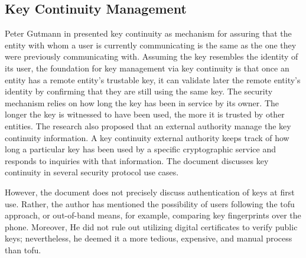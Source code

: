 \subsection{Key Continuity Management}
Peter Gutmann in \cite{gutmann-kcm-01} presented key continuity as  mechanism for assuring that the entity with whom a user is currently communicating is the same as the one they were previously communicating with.
Assuming the key resembles the identity of its user, the foundation for key management via key continuity is that once an entity has a remote entity's trustable key, it can validate later the remote entity's identity by confirming that they are still using the same key. The security mechanism relies on how long the key has been in service by its owner. The longer the key is witnessed to have been used, the more it is trusted by other entities. The research also proposed that an external authority manage the key continuity information. A key continuity external authority keeps track of how long a particular key has been used by a specific cryptographic service and responds to inquiries with that information. The document discusses key continuity in several security protocol use cases.
\par
However, the document does not precisely discuss authentication of keys at first use. Rather, the author has mentioned the possibility of users following the \gls{tofu} approach, or out-of-band means, for example, comparing key fingerprints over the phone. Moreover, He did not rule out utilizing digital certificates to verify public keys; nevertheless, he deemed it a more tedious, expensive, and manual process than \gls{tofu}. 

